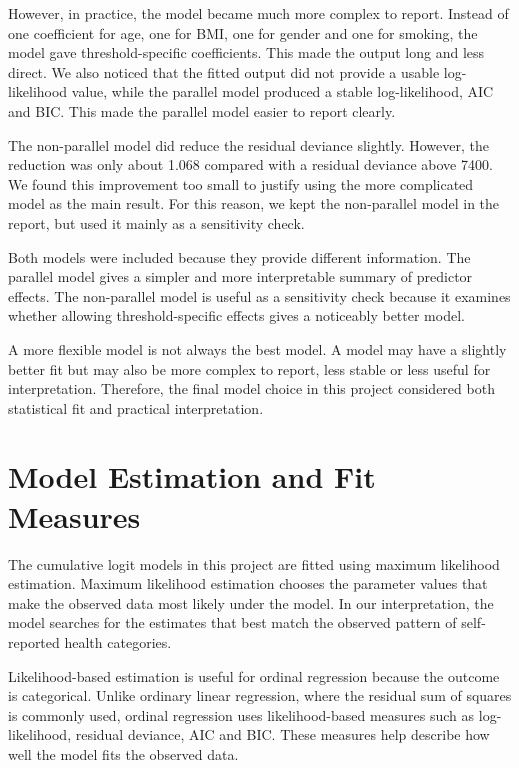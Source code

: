 \documentclass{article}
\begin{document}
However, in practice, the model became much more complex to report.
Instead of one coefficient for age, one for BMI, one for gender and one
for smoking, the model gave threshold-specific coefficients. This made
the output long and less direct. We also noticed that the fitted output
did not provide a usable log-likelihood value, while the parallel model
produced a stable log-likelihood, AIC and BIC. This made the parallel
model easier to report clearly.

The non-parallel model did reduce the residual deviance slightly.
However, the reduction was only about 1.068 compared with a residual
deviance above 7400. We found this improvement too small to justify
using the more complicated model as the main result. For this reason, we
kept the non-parallel model in the report, but used it mainly as a
sensitivity check.

Both models were included because they provide different information.
The parallel model gives a simpler and more interpretable summary of
predictor effects. The non-parallel model is useful as a sensitivity
check because it examines whether allowing threshold-specific effects
gives a noticeably better model.

A more flexible model is not always the best model. A model may have a
slightly better fit but may also be more complex to report, less stable
or less useful for interpretation. Therefore, the final model choice in
this project considered both statistical fit and practical
interpretation.

\section{Model Estimation and Fit
Measures}\label{model-estimation-and-fit-measures}

The cumulative logit models in this project are fitted using maximum
likelihood estimation. Maximum likelihood estimation chooses the
parameter values that make the observed data most likely under the
model. In our interpretation, the model searches for the estimates that
best match the observed pattern of self-reported health categories.

Likelihood-based estimation is useful for ordinal regression because the
outcome is categorical. Unlike ordinary linear regression, where the
residual sum of squares is commonly used, ordinal regression uses
likelihood-based measures such as log-likelihood, residual deviance, AIC
and BIC. These measures help describe how well the model fits the
observed data.
\end{document}
